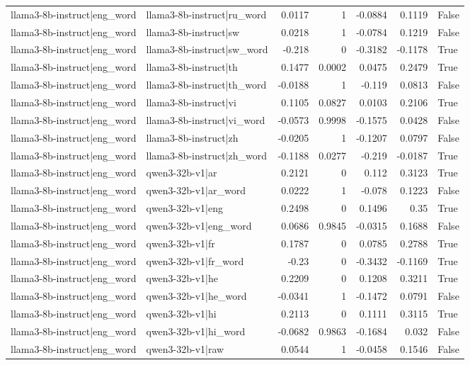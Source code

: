 \begin{table}
\begin{tabular}{l l r r r r l}
llama3-8b-instruct|eng_word & llama3-8b-instruct|ru_word & 0.0117 & 1 & -0.0884 & 0.1119 & False \\
llama3-8b-instruct|eng_word & llama3-8b-instruct|sw & 0.0218 & 1 & -0.0784 & 0.1219 & False \\
llama3-8b-instruct|eng_word & llama3-8b-instruct|sw_word & -0.218 & 0 & -0.3182 & -0.1178 & True \\
llama3-8b-instruct|eng_word & llama3-8b-instruct|th & 0.1477 & 0.0002 & 0.0475 & 0.2479 & True \\
llama3-8b-instruct|eng_word & llama3-8b-instruct|th_word & -0.0188 & 1 & -0.119 & 0.0813 & False \\
llama3-8b-instruct|eng_word & llama3-8b-instruct|vi & 0.1105 & 0.0827 & 0.0103 & 0.2106 & True \\
llama3-8b-instruct|eng_word & llama3-8b-instruct|vi_word & -0.0573 & 0.9998 & -0.1575 & 0.0428 & False \\
llama3-8b-instruct|eng_word & llama3-8b-instruct|zh & -0.0205 & 1 & -0.1207 & 0.0797 & False \\
llama3-8b-instruct|eng_word & llama3-8b-instruct|zh_word & -0.1188 & 0.0277 & -0.219 & -0.0187 & True \\
llama3-8b-instruct|eng_word & qwen3-32b-v1|ar & 0.2121 & 0 & 0.112 & 0.3123 & True \\
llama3-8b-instruct|eng_word & qwen3-32b-v1|ar_word & 0.0222 & 1 & -0.078 & 0.1223 & False \\
llama3-8b-instruct|eng_word & qwen3-32b-v1|eng & 0.2498 & 0 & 0.1496 & 0.35 & True \\
llama3-8b-instruct|eng_word & qwen3-32b-v1|eng_word & 0.0686 & 0.9845 & -0.0315 & 0.1688 & False \\
llama3-8b-instruct|eng_word & qwen3-32b-v1|fr & 0.1787 & 0 & 0.0785 & 0.2788 & True \\
llama3-8b-instruct|eng_word & qwen3-32b-v1|fr_word & -0.23 & 0 & -0.3432 & -0.1169 & True \\
llama3-8b-instruct|eng_word & qwen3-32b-v1|he & 0.2209 & 0 & 0.1208 & 0.3211 & True \\
llama3-8b-instruct|eng_word & qwen3-32b-v1|he_word & -0.0341 & 1 & -0.1472 & 0.0791 & False \\
llama3-8b-instruct|eng_word & qwen3-32b-v1|hi & 0.2113 & 0 & 0.1111 & 0.3115 & True \\
llama3-8b-instruct|eng_word & qwen3-32b-v1|hi_word & -0.0682 & 0.9863 & -0.1684 & 0.032 & False \\
llama3-8b-instruct|eng_word & qwen3-32b-v1|raw & 0.0544 & 1 & -0.0458 & 0.1546 & False \\

\end{tabular}
\end{table}
